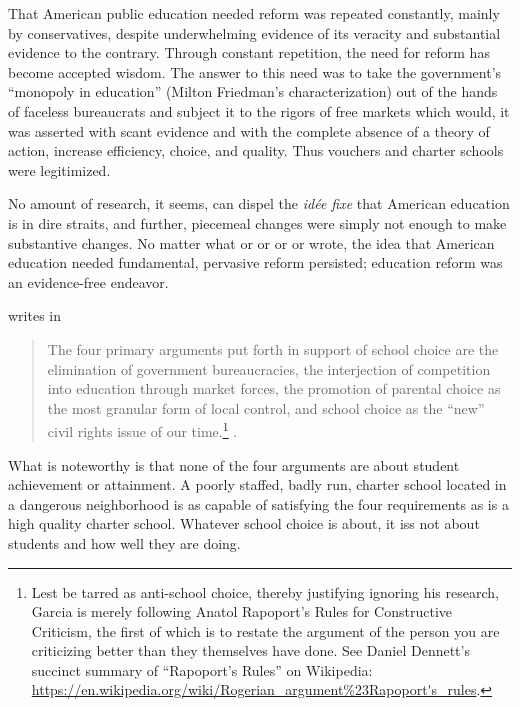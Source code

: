 That American public education needed reform was repeated constantly, mainly by conservatives, despite underwhelming evidence of its veracity and substantial evidence to the contrary. Through constant repetition, the need for reform has become accepted wisdom. The answer to this need was to take the government's ``monopoly in education'' (Milton Friedman's characterization) out of the hands of faceless bureaucrats and subject it to the rigors of free markets which would, it was asserted with scant evidence and with the complete absence of a theory of action, increase efficiency, choice, and quality. Thus vouchers and charter schools were legitimized.

No amount of research, it seems, can dispel the \textit{idée fixe} that American education is in dire straits, and further, piecemeal changes were simply not enough to make substantive changes. No matter what \textcite{Henig1994} or \textcite{Berliner.Biddle1997} or \textcite{Nichols.Berliner2007} or \textcite{Glass2008} or \textcite{Berliner.Glass2014} wrote, the idea that American education needed fundamental, pervasive reform persisted; education reform was an evidence-free endeavor.

\citeauthor{Garcia2018} writes in 
\begin{quote}\OnehalfSpacing%
The four primary arguments put forth in support of school choice are the elimination of government bureaucracies, the interjection of competition into education through market forces, the promotion of parental choice as the most granular form of local control, and school choice as the ``new'' civil rights issue of our time.\footnote{Lest \citeauthor{Garcia2018} be tarred as anti-school choice, thereby justifying ignoring his research, Garcia is merely following Anatol Rapoport's Rules for Constructive Criticism, the first of which is to restate the argument of the person you are criticizing better than they themselves have done. See Daniel Dennett's succinct summary of ``Rapoport's Rules''  on Wikipedia: \url{https://en.wikipedia.org/wiki/Rogerian_argument\%23Rapoport's_rules}.} .
\end{quote} What is noteworthy is that none of the four arguments are about student achievement or attainment. A poorly staffed, badly run, charter school located in a dangerous neighborhood is as capable of satisfying the four requirements as is a high quality charter school. Whatever school choice is about, it iss not about students and how well they are doing.

